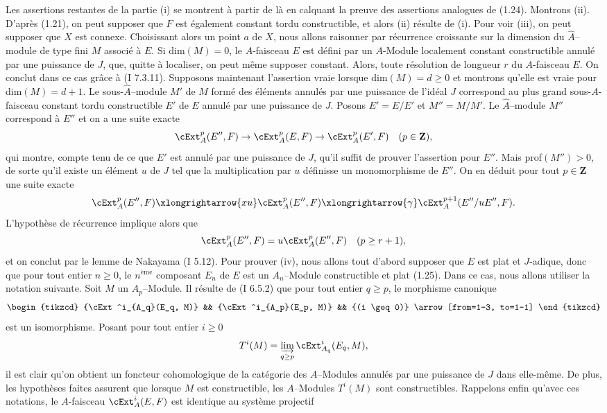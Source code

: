 Les assertions restantes de la partie (i) se montrent à partir de là en calquant la preuve des assertions analogues de (1.24). Montrons (ii). D'après (1.21), on peut supposer que $F$ est également constant tordu constructible, et alors (ii) résulte de (i). Pour voir (iii), on peut supposer que $X$ est connexe. Choisissant alors un point $a$ de $X$, nous allons raisonner par récurrence croissante sur la dimension du $\hat{A}$--module de type fini $M$ associé à $E$. Si dim$(M) = 0$, le $A$-faisceau $E$ est défini par un $A$-Module localement constant constructible annulé par une puissance de $J$, que, quitte à localiser, on peut même supposer constant. Alors, toute résolution de longueur $r$ du $A$-faisceau $E$. On conclut dans ce cas grâce à (I 7.3.11). Supposons maintenant l'assertion vraie lorsque dim$(M) = d \geq 0$ et montrons qu'elle est vraie pour dim$(M) = d+1$. Le sous-$\hat{A}$--module $M'$ de $M$ formé des éléments annulés par une puissance de l'idéal $J$ correspond au plus grand sous-$A$-faisceau constant tordu constructible $E'$ de $E$ annulé par une puissance de $J$. Posons $E' = E/E'$ et $M'' = M/M'$. Le $\hat{A}$--module $M''$ correspond à $E''$ et on a une suite exacte
$$
\cExt^p_A(E'', F) \to \cExt^p_A(E, F) \to \cExt^p_A(E', F) \quad (p \in \mathbf{Z}),
$$
qui montre, compte tenu de ce que $E'$ est annulé par une puissance de $J$, qu'il suffit de prouver l'assertion pour $E''$. Mais prof$(M'') > 0$, de sorte qu'il existe un élément $u$ de $J$ tel que la multiplication par $u$ définisse un monomorphisme de $E''$. On en déduit pour tout $p \in \mathbf{Z}$ une suite exacte
$$
\cExt^p_A(E'', F) \xlongrightarrow{xu} \cExt^p_A(E'', F) \xlongrightarrow{\gamma} \cExt^{p+1}_A(E''/uE'', F).
$$
L'hypothèse de récurrence implique alors que 
$$
\cExt^p_A(E'', F) = u \cExt^p_A(E'', F) \quad (p \geq r+1),
$$
et on conclut par le lemme de Nakayama (I 5.12). Pour prouver (iv), nous allons tout d'abord supposer que $E$ est plat et $J$-adique, donc que pour tout entier $n \geq 0$, le $n^{\text{ème}}$ composant $E_n$ de $E$ est un $A_n$--Module constructible et plat (1.25). Dans ce cas, nous allons utiliser la notation suivante. Soit $M$ un $A_p$--Module. Il résulte de (I 6.5.2) que pour tout entier $q \geq p$, le morphisme canonique
\[\begin{tikzcd}
	{\cExt^i_{A_q}(E_q, M)} && {\cExt^i_{A_p}(E_p, M)} && {(i \geq 0)}
	\arrow[from=1-3, to=1-1]
\end{tikzcd}\]
est un isomorphisme. Posant pour tout entier $i \geq 0$
$$
T^i(M) = \varinjlim_{q \geq p}\cExt^i_{A_q}(E_q, M),
$$
il est clair qu'on obtient un foncteur cohomologique de la catégorie des $A$--Modules annulés par une puissance de $J$ dans elle-même. De plus, les hypothèses faites assurent que lorsque $M$ est constructible, les $A$--Modules $T^i(M)$ sont constructibles. Rappelons enfin qu'avec ces notations, le $A$-faisceau $\cExt^i_A(E, F)$ est identique au système projectif
